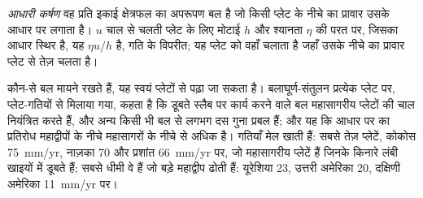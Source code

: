 \begin{omfigure}

\par{}\label{fig:b3:mantle-convection:ridge-push}
\end{omfigure}

\begin{definition}[आधारी कर्षण]\label{def:b3:mantle-convection:basal-drag}
\emph{आधारी कर्षण} वह प्रति इकाई क्षेत्रफल का अपरूपण बल है जो
किसी प्लेट के नीचे का प्रावार उसके आधार पर लगाता है। $u$ चाल से चलती प्लेट के लिए
मोटाई $h$ और श्यानता $\eta$ की परत पर, जिसका आधार स्थिर है,
यह $\eta u/h$ है, गति के विपरीत; यह प्लेट को वहाँ चलाता है जहाँ
उसके नीचे का प्रावार प्लेट से तेज़ चलता है।
\end{definition}

कौन-से बल मायने रखते हैं, यह स्वयं प्लेटों से पढ़ा जा सकता है। बलाघूर्ण-संतुलन
प्रत्येक प्लेट पर, प्लेट-गतियों से मिलाया गया, कहता है कि डूबते स्लैब पर कार्य करने वाले बल
महासागरीय प्लेटों की चाल नियंत्रित करते हैं, और अन्य किसी भी बल से लगभग दस गुना
प्रबल हैं; और यह कि आधार पर का प्रतिरोध महाद्वीपों के नीचे
महासागरों के नीचे से अधिक है। गतियाँ मेल खाती हैं: सबसे तेज़ प्लेटें, कोकोस
\qty{75}{mm/yr}, नाज़का 70 और प्रशांत \qty{66}{mm/yr} पर, जो महासागरीय
प्लेटें हैं जिनके किनारे लंबी खाइयों में डूबते हैं; सबसे धीमी वे हैं जो बड़े महाद्वीप ढोती हैं:
यूरेशिया 23, उत्तरी अमेरिका 20, दक्षिणी अमेरिका \qty{11}{mm/yr} पर।

